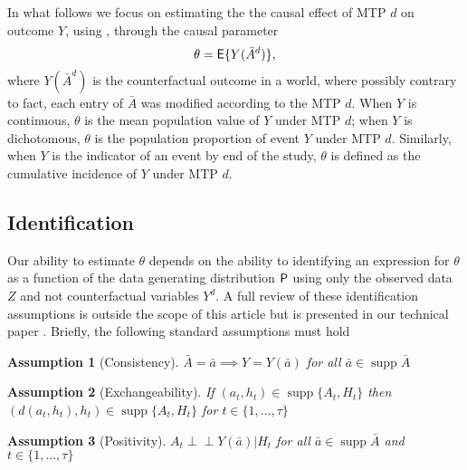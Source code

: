 \documentclass[]{jss}
\begin{document}
In what follows we focus on estimating the the causal effect of MTP \(d\) on
outcome \(Y\), using , through the causal parameter
\begin{equation}
  \theta = \mathsf{E}\{Y(\bar A^d)\}\text{,}
\end{equation}
where \(Y(\bar A^d)\) is the counterfactual outcome in a world, where
possibly contrary to fact, each entry of \(\bar{A}\) was modified
according to the MTP \(d\). When \(Y\) is continuous, \(\theta\) is
the mean population value of \(Y\) under MTP \(d\); when \(Y\) is
dichotomous, \(\theta\) is the population proportion of event \(Y\)
under MTP \(d\). Similarly, when \(Y\) is the indicator of an event by
end of the study, \(\theta\) is defined as the cumulative incidence of
\(Y\) under MTP \(d\).

\hypertarget{identification}{%
\subsection{Identification}\label{identification}}

Our ability to estimate \(\theta\) depends on the ability to
identifying an expression for \(\theta\) as a function of the data
generating distribution \(\mathsf{P}\) using only the observed data \(Z\)
and not counterfactual variables $Y^d$. A full review of these
identification assumptions is outside the scope of this article but is
presented in our technical paper
\citep{diazNonparametricCausalEffects2020a}.  Briefly, the following
standard assumptions must hold

\newtheorem{assumption}{Assumption}

\begin{assumption}[Consistency]
\(\bar{A} = \bar{a} \implies Y = Y(\bar{a})\) for all $\bar{a} \in \mathop{\mathrm{supp}}\bar{A}$ 
\end{assumption}
\begin{assumption}[Exchangeability]
If $(a_t, h_t) \in \mathop{\mathrm{supp}}\{A_t, H_t\}$ then $(d(a_t, h_t), h_t) \in \mathop{\mathrm{supp}}\{A_t, H_t\}$ for $t \in \{1, ..., \tau \}$
\end{assumption}
\begin{assumption}[Positivity]
$A_t \perp \!\!\! \perp Y(\bar{a}) | H_t$ for all $\bar{a} \in \mathop{\mathrm{supp}}\bar{A}$ and $t \in \{1, ..., \tau\}$
\end{assumption}
\end{document}
